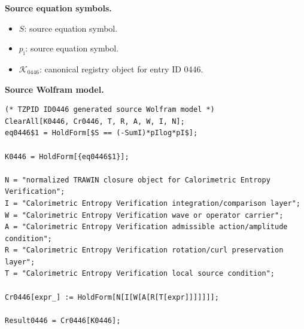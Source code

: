 \begin{minipage}[t]{0.49\linewidth}
\begingroup
\small
\raggedright
\textbf{Source equation symbols.}\par
\begin{itemize}[leftmargin=1.35em,itemsep=1pt,topsep=1pt,parsep=0pt]
    \item $S$: source equation symbol.
    \item $p_{\mathrm{i}}$: source equation symbol.
    \item $\mathcal{K}_{0446}$: canonical registry object for entry ID 0446.
\end{itemize}
\endgroup
\end{minipage}\hfill
\begin{minipage}[t]{0.47\linewidth}
\begingroup
\scriptsize
\raggedright
\textbf{Source Wolfram model.}\par
\begin{Verbatim}[fontsize=\tiny,breaklines=true,breakanywhere=true]
(* TZPID ID0446 generated source Wolfram model *)
ClearAll[K0446, Cr0446, T, R, A, W, I, N];
eq0446$1 = HoldForm[$S == (-SumI)*pIlog*pI$];

K0446 = HoldForm[{eq0446$1}];

N = "normalized TRAWIN closure object for Calorimetric Entropy Verification";
I = "Calorimetric Entropy Verification integration/comparison layer";
W = "Calorimetric Entropy Verification wave or operator carrier";
A = "Calorimetric Entropy Verification admissible action/amplitude condition";
R = "Calorimetric Entropy Verification rotation/curl preservation layer";
T = "Calorimetric Entropy Verification local source condition";

Cr0446[expr_] := HoldForm[N[I[W[A[R[T[expr]]]]]]];

Result0446 = Cr0446[K0446];
\end{Verbatim}
\endgroup
\end{minipage}

